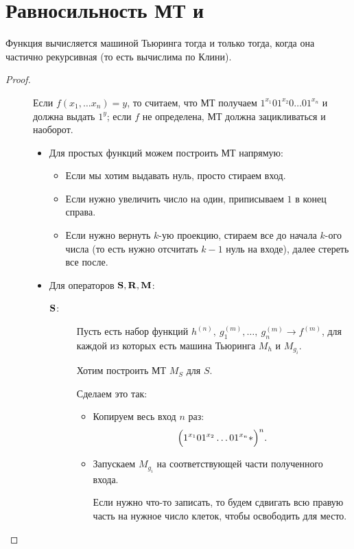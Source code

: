 \section{Равносильность МТ и \crf} 
\begin{thm}
	Функция вычисляется машиной Тьюринга тогда и только тогда, когда она частично рекурсивная (то есть вычислима по Клини).
\end{thm}
\begin{proof}
    \begin{description}
		\item[]
			Если $ f(x_1, \ldots x_n) = y$, то считаем, что МТ получаем $ 1^{x_1}01^{x_2}0\ldots 01^{x_n}$ и должна выдать $ 1^{y}$; если  $ f$ не определена, МТ должна зацикливаться и наоборот.
			\begin{itemize}
				\item Для простых функций можем построить МТ напрямую:
					\begin{itemize}
						\item Если мы хотим выдавать нуль, просто стираем вход.
						\item Если нужно увеличить число на один, приписываем $ 1$ в конец справа.
						\item Если нужно вернуть $ k$-ую проекцию, стираем все до начала $ k$-ого числа (то есть нужно отсчитать $ k-1$ нуль на входе), далее стереть все после.
					\end{itemize}
				\item Для операторов $ \S, \R, \M$:
					\begin{description}
						\item[$ \S$:]
							Пусть есть набор функций $ h^{(n)}, ~ g_1^{(m)}, \ldots , ~ g_n^{(m)} \longrightarrow f^{(m)}$, для каждой из которых есть машина Тьюринга $ M_{h}$ и $ M_{g_{i}}$. 

							Хотим построить МТ $ M_{S}$ для $ S$.

							Сделаем это так:
							\begin{itemize}
								\item Копируем весь вход $ n$ раз:
									\[
										\Bigl(1^{x_1}01^{x_2}\ldots 01^{x_n} \ast \Bigr)^{n}
									.\] 
								\item Запускаем $ M_{g_i}$ на соответствующей части полученного входа. 

							Если нужно что-то записать, то будем сдвигать всю правую часть на нужное число клеток, чтобы освободить для место.


\end{itemize}
\end{description}
\end{itemize}
\end{description}
\end{proof}

